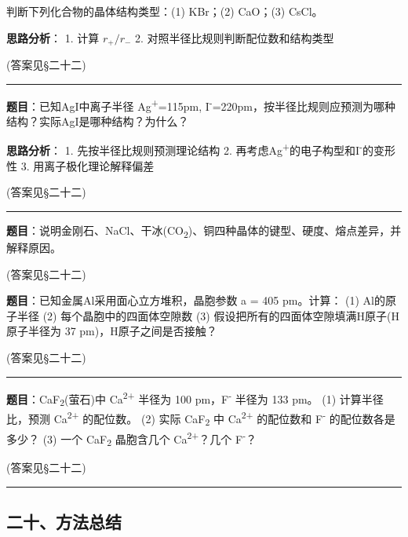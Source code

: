 判断下列化合物的晶体结构类型：(1) KBr；(2) CaO；(3) CsCl。

\textbf{思路分析}：
1. 计算 \(r_+/r_-\)
2. 对照半径比规则判断配位数和结构类型

(答案见§二十二)

\begin{center}\rule{0.5\linewidth}{0.5pt}\end{center}

\textbf{题目}：已知AgI中离子半径 Ag\textsuperscript{+}=115pm, I\textsuperscript{-}=220pm，按半径比规则应预测为哪种结构？实际AgI是哪种结构？为什么？

\textbf{思路分析}：
1. 先按半径比规则预测理论结构
2. 再考虑Ag\textsuperscript{+}的电子构型和I\textsuperscript{-}的变形性
3. 用离子极化理论解释偏差

(答案见§二十二)

\begin{center}\rule{0.5\linewidth}{0.5pt}\end{center}

\textbf{题目}：说明金刚石、NaCl、干冰(CO\textsubscript{2})、铜四种晶体的键型、硬度、熔点差异，并解释原因。

(答案见§二十二)

\textbf{题目}：已知金属Al采用面心立方堆积，晶胞参数 a = 405 pm。计算：
(1) Al的原子半径
(2) 每个晶胞中的四面体空隙数
(3) 假设把所有的四面体空隙填满H原子(H原子半径为 37 pm)，H原子之间是否接触？

(答案见§二十二)

\begin{center}\rule{0.5\linewidth}{0.5pt}\end{center}

\textbf{题目}：CaF\textsubscript{2}(萤石)中 Ca\textsuperscript{2+} 半径为 100 pm，F\textsuperscript{-} 半径为 133 pm。
(1) 计算半径比，预测 Ca\textsuperscript{2+} 的配位数。
(2) 实际 CaF\textsubscript{2} 中 Ca\textsuperscript{2+} 的配位数和 F\textsuperscript{-} 的配位数各是多少？
(3) 一个 CaF\textsubscript{2} 晶胞含几个 Ca\textsuperscript{2+}？几个 F\textsuperscript{-}？

(答案见§二十二)

\begin{center}\rule{0.5\linewidth}{0.5pt}\end{center}

\subsection{二十、方法总结}\label{ux4e8cux5341ux65b9ux6cd5ux603bux7ed3}

